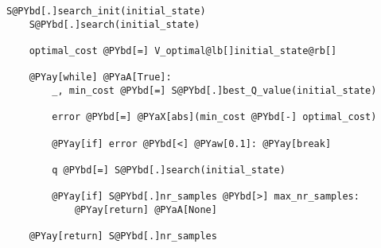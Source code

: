 \begin{Verbatim}[commandchars=@\[\]]
    S@PYbd[.]search_init(initial_state)
    S@PYbd[.]search(initial_state)

    optimal_cost @PYbd[=] V_optimal@lb[]initial_state@rb[]

    @PYay[while] @PYaA[True]:
        _, min_cost @PYbd[=] S@PYbd[.]best_Q_value(initial_state)

        error @PYbd[=] @PYaX[abs](min_cost @PYbd[-] optimal_cost)

        @PYay[if] error @PYbd[<] @PYaw[0.1]: @PYay[break]

        q @PYbd[=] S@PYbd[.]search(initial_state)

        @PYay[if] S@PYbd[.]nr_samples @PYbd[>] max_nr_samples:
            @PYay[return] @PYaA[None]

    @PYay[return] S@PYbd[.]nr_samples
\end{Verbatim}
